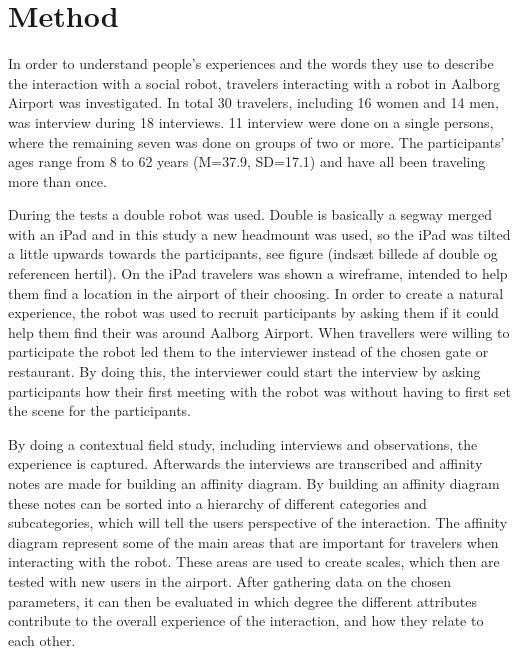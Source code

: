 \section{Method}
\label{Method}
%
In order to understand people's experiences and the words they use to describe the interaction with a social robot, travelers interacting with a robot in Aalborg Airport was investigated. In total 30 travelers, including 16 women and 14 men, was interview during 18 interviews. 11 interview were done on a single persons, where the remaining seven was done on groups of two or more. The participants' ages range from 8 to 62 years (M=37.9, SD=17.1) and have all been traveling more than once.

During the tests a double robot was used. Double is basically a segway merged with an iPad and in this study a new headmount was used, so the iPad was tilted a little upwards towards the participants, see figure (indsæt billede af double og referencen hertil). On the iPad travelers was shown a wireframe, intended to help them find a location in the airport of their choosing. In order to create a natural experience, the robot was used to recruit participants by asking them if it could help them find their was around Aalborg Airport. When travellers were willing to participate the robot led them to the interviewer instead of the chosen gate or restaurant. By doing this, the interviewer could start the interview by asking participants how their first meeting with the robot was without having to first set the scene for the participants. 

By doing a contextual field study, including interviews and observations, the experience is captured. Afterwards the interviews are transcribed and affinity notes are made for building an affinity diagram. By building an affinity diagram these notes can be sorted into a hierarchy of different categories and subcategories, which will tell the users perspective of the interaction. The affinity diagram represent some of the main areas that are important for travelers when interacting with the robot. These areas are used to create scales, which then are tested with new users in the airport. After gathering data on the chosen parameters, it can then be evaluated in which degree the different attributes contribute to the overall experience of the interaction, and how they relate to each other.
